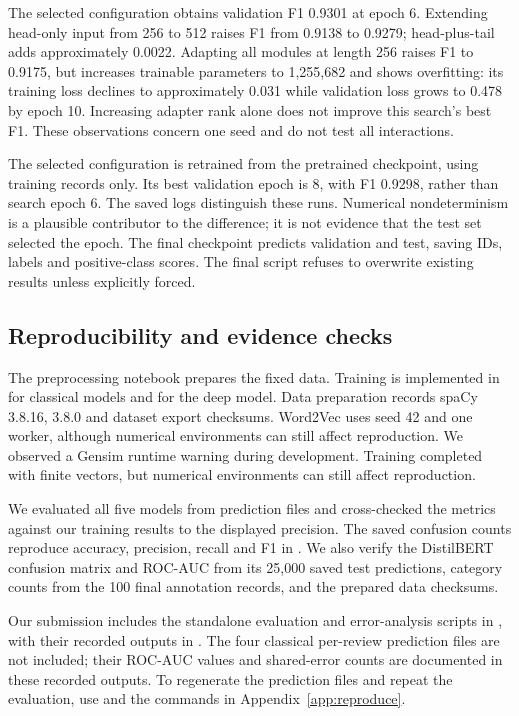 The selected configuration obtains validation F1 0.9301 at epoch 6. Extending
head-only input from 256 to 512 raises F1 from 0.9138 to 0.9279; head-plus-tail
adds approximately 0.0022. Adapting all modules at length 256 raises F1 to 0.9175,
but increases trainable parameters to 1,255,682 and shows overfitting: its
training loss declines to approximately 0.031 while validation loss grows to
0.478 by epoch 10. Increasing adapter rank alone does not improve this search's
best F1. These observations concern one seed and do not test all interactions.

The selected configuration is retrained from the pretrained checkpoint, using
training records only. Its best validation epoch is 8, with F1 0.9298, rather
than search epoch 6. The saved logs distinguish these runs. Numerical
nondeterminism is a plausible contributor to the difference; it is not evidence
that the test set selected the epoch. The final checkpoint predicts validation
and test, saving IDs, labels and positive-class scores. The final script refuses
to overwrite existing results unless explicitly forced.

\subsection{Reproducibility and evidence checks}
The preprocessing notebook prepares the fixed data. Training is implemented in
 for classical models and  for the deep
model. Data preparation records spaCy 3.8.16,
 3.8.0 and dataset export checksums. Word2Vec uses seed 42
and one worker, although numerical environments can still affect reproduction.
We observed a Gensim runtime warning during development. Training completed
with finite vectors, but numerical environments can still affect reproduction.

We evaluated all five models from prediction files and cross-checked the metrics
against our training results to the displayed precision. The saved confusion
counts reproduce accuracy, precision, recall and F1 in .
We also verify the DistilBERT confusion matrix and ROC-AUC from its 25,000 saved
test predictions, category counts from the 100 final annotation records, and
the prepared data checksums.

Our submission includes the standalone evaluation and error-analysis scripts
in , with their recorded outputs in .
The four classical per-review prediction files are not included; their ROC-AUC
values and shared-error counts are documented in these recorded outputs.
To regenerate the prediction files and repeat the evaluation, use
 and the commands in Appendix~\ref{app:reproduce}.

